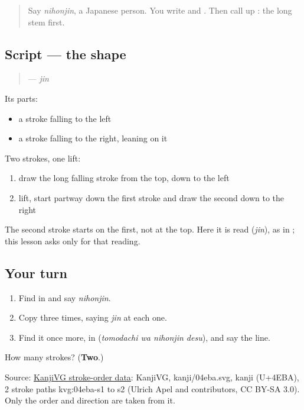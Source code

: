 \label{lesson:JA-W256-jin-kanji}



\begin{quote}
Say \emph{nihonjin}, a Japanese person. You write \textbf{} and \textbf{}. Then call up \textbf{}: the long stem first.
\end{quote}

\subsection*{Script — the shape}
\begin{quote}
\textbf{} — \emph{jin}
\end{quote}

Its parts:

\begin{itemize}
\raggedright
  \item a stroke falling to the left
  \item a stroke falling to the right, leaning on it
\end{itemize}

Two strokes, one lift:

\begin{enumerate}
\raggedright
  \item draw the long falling stroke from the top, down to the left
  \item lift, start partway down the first stroke and draw the second down to the right
\end{enumerate}

The second stroke starts on the first, not at the top. Here it is read \textbf{} (\emph{jin}), as in \textbf{}; this lesson asks only for that reading.

\subsection*{Your turn}
\begin{enumerate}
\raggedright
  \item Find \textbf{} in \textbf{} and say \emph{nihonjin}.
  \item Copy \textbf{} three times, saying \emph{jin} at each one.
  \item Find it once more, in \textbf{ } (\emph{tomodachi wa nihonjin desu}), and say the line.
\end{enumerate}

\begin{tcolorbox}[breakable,colback=teal!4,colframe=teal!35!black,title={Before you move on}]
How many strokes? (\textbf{Two}.)

Source: \href{https://github.com/KanjiVG/kanjivg/blob/master/kanji/04eba.svg}{KanjiVG stroke-order data}: KanjiVG, kanji/04eba.svg, kanji  (U+4EBA), 2 stroke paths kvg:04eba-s1 to s2 (Ulrich Apel and contributors, CC BY-SA 3.0). Only the order and direction are taken from it.
\end{tcolorbox}
